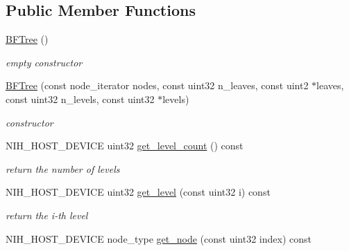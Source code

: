 \subsection*{\-Public \-Member \-Functions}
\begin{DoxyCompactItemize}
\item 
\hypertarget{structnih_1_1_b_f_tree_afe4371df8f9c91081a16ff33098a1342}{
\hyperlink{structnih_1_1_b_f_tree_afe4371df8f9c91081a16ff33098a1342}{\-B\-F\-Tree} ()}
\label{structnih_1_1_b_f_tree_afe4371df8f9c91081a16ff33098a1342}

\begin{DoxyCompactList}\small\item\em empty constructor \end{DoxyCompactList}\item 
\hypertarget{structnih_1_1_b_f_tree_aff13c32b85c7604d9bc1d14fa5416334}{
\hyperlink{structnih_1_1_b_f_tree_aff13c32b85c7604d9bc1d14fa5416334}{\-B\-F\-Tree} (const node\-\_\-iterator nodes, const uint32 n\-\_\-leaves, const uint2 $\ast$leaves, const uint32 n\-\_\-levels, const uint32 $\ast$levels)}
\label{structnih_1_1_b_f_tree_aff13c32b85c7604d9bc1d14fa5416334}

\begin{DoxyCompactList}\small\item\em constructor \end{DoxyCompactList}\item 
\hypertarget{structnih_1_1_b_f_tree_a39ddeb39862a4572fdfb08a631d5c85e}{
\-N\-I\-H\-\_\-\-H\-O\-S\-T\-\_\-\-D\-E\-V\-I\-C\-E uint32 \hyperlink{structnih_1_1_b_f_tree_a39ddeb39862a4572fdfb08a631d5c85e}{get\-\_\-level\-\_\-count} () const }
\label{structnih_1_1_b_f_tree_a39ddeb39862a4572fdfb08a631d5c85e}

\begin{DoxyCompactList}\small\item\em return the number of levels \end{DoxyCompactList}\item 
\hypertarget{structnih_1_1_b_f_tree_ab9f387666c6110dc23033b43b2507477}{
\-N\-I\-H\-\_\-\-H\-O\-S\-T\-\_\-\-D\-E\-V\-I\-C\-E uint32 \hyperlink{structnih_1_1_b_f_tree_ab9f387666c6110dc23033b43b2507477}{get\-\_\-level} (const uint32 i) const }
\label{structnih_1_1_b_f_tree_ab9f387666c6110dc23033b43b2507477}

\begin{DoxyCompactList}\small\item\em return the i-\/th level \end{DoxyCompactList}\item 
\hypertarget{structnih_1_1_b_f_tree_ac7d9b23a296d7c36eccdaaccfb90009e}{
\-N\-I\-H\-\_\-\-H\-O\-S\-T\-\_\-\-D\-E\-V\-I\-C\-E node\-\_\-type \hyperlink{structnih_1_1_b_f_tree_ac7d9b23a296d7c36eccdaaccfb90009e}{get\-\_\-node} (const uint32 index) const }
\label{structnih_1_1_b_f_tree_ac7d9b23a296d7c36eccdaaccfb90009e}


\end{DoxyCompactItemize}
